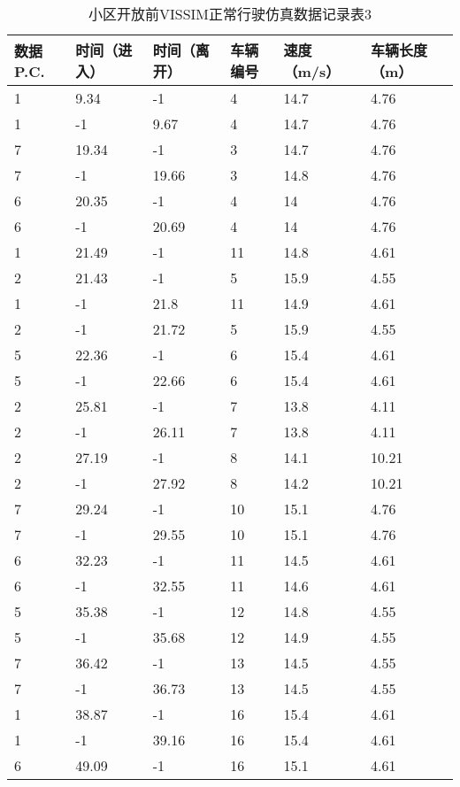 \begin{table*}[h!]
  \centering
  \small
  \caption{小区开放前VISSIM正常行驶仿真数据记录表3}
  \begin{tabular*}{\linewidth}{p{50pt}<{\centering}p{50pt}<{\centering}
    p{60pt}<{\centering}p{60pt}<{\centering}p{60pt}<{\centering}p{70pt}<{\centering}}
    \toprule
    数据P.C. & 时间（进入） & 时间（离开） & 车辆编号& 速度（m/s） & 车辆长度（m） \\
    \midrule
    1 & 9.34 & -1 & 4 & 14.7 & 4.76 \\
    1 & -1 & 9.67 & 4 & 14.7 & 4.76 \\
    7 & 19.34 & -1 & 3 & 14.7 & 4.76 \\
    7 & -1 & 19.66 & 3 & 14.8 & 4.76 \\
    6 & 20.35 & -1 & 4 & 14 & 4.76 \\
    6 & -1 & 20.69 & 4 & 14 & 4.76 \\
    1 & 21.49 & -1 & 11 & 14.8 & 4.61 \\
    2 & 21.43 & -1 & 5 & 15.9 & 4.55 \\
    1 & -1 & 21.8 & 11 & 14.9 & 4.61 \\
    2 & -1 & 21.72 & 5 & 15.9 & 4.55 \\
    5 & 22.36 & -1 & 6 & 15.4 & 4.61 \\
    5 & -1 & 22.66 & 6 & 15.4 & 4.61 \\
    2 & 25.81 & -1 & 7 & 13.8 & 4.11 \\
    2 & -1 & 26.11 & 7 & 13.8 & 4.11 \\
    2 & 27.19 & -1 & 8 & 14.1 & 10.21 \\
    2 & -1 & 27.92 & 8 & 14.2 & 10.21 \\
    7 & 29.24 & -1 & 10 & 15.1 & 4.76 \\
    7 & -1 & 29.55 & 10 & 15.1 & 4.76 \\
    6 & 32.23 & -1 & 11 & 14.5 & 4.61 \\
    6 & -1 & 32.55 & 11 & 14.6 & 4.61 \\
    5 & 35.38 & -1 & 12 & 14.8 & 4.55 \\
    5 & -1 & 35.68 & 12 & 14.9 & 4.55 \\
    7 & 36.42 & -1 & 13 & 14.5 & 4.55 \\
    7 & -1 & 36.73 & 13 & 14.5 & 4.55 \\
    1 & 38.87 & -1 & 16 & 15.4 & 4.61 \\
    1 & -1 & 39.16 & 16 & 15.4 & 4.61 \\
    6 & 49.09 & -1 & 16 & 15.1 & 4.61 \\

\end{tabular*}
\end{table*}
